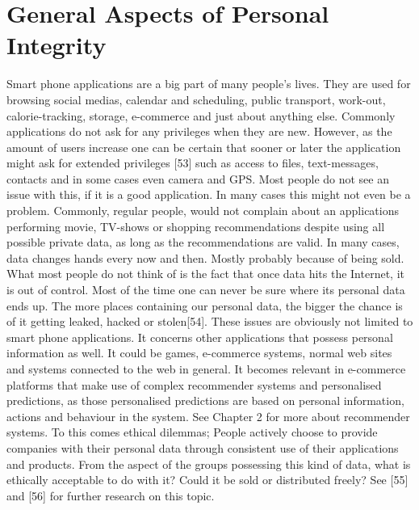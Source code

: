 \section{General Aspects of Personal Integrity}
Smart phone applications are a big part of many people’s lives. They are used for browsing social medias, calendar and scheduling, public transport, work-out, calorie-tracking, storage, e-commerce and just about anything else. Commonly applications do not ask for any privileges when they are new. However, as the amount of users increase one can be certain that sooner or later the application might ask for extended privileges [53] such as access to files, text-messages, contacts and in some cases even camera and GPS. Most people do not see an issue with this, if it is a good application. In many cases this might not even be a problem. Commonly, regular people, would not complain about an applications performing movie, TV-shows or shopping recommendations despite using all possible private data, as long as the recommendations are valid. In many cases, data changes hands every now and then. Mostly probably because of being sold. What most people do not think of is the fact that once data hits the Internet, it is out of control. Most of the time one can never be sure where its personal data ends up. The more places containing our personal data, the bigger the chance is of it getting leaked, hacked or stolen[54]. These issues are obviously not limited to smart phone applications. It concerns other applications that possess personal information as well. It could be games, e-commerce systems, normal web sites and systems connected to the web in general. It becomes relevant in e-commerce platforms that make use of complex recommender systems and personalised predictions, as those personalised predictions are based on personal information, actions and behaviour in the system. See Chapter 2 for more about recommender systems. To this comes ethical dilemmas; People actively choose to provide companies with their personal data through consistent use of their applications and products. From the aspect of the groups possessing this kind of data, what is ethically acceptable to do with it? Could it be sold or distributed freely? See [55] and [56] for further research on this topic.


